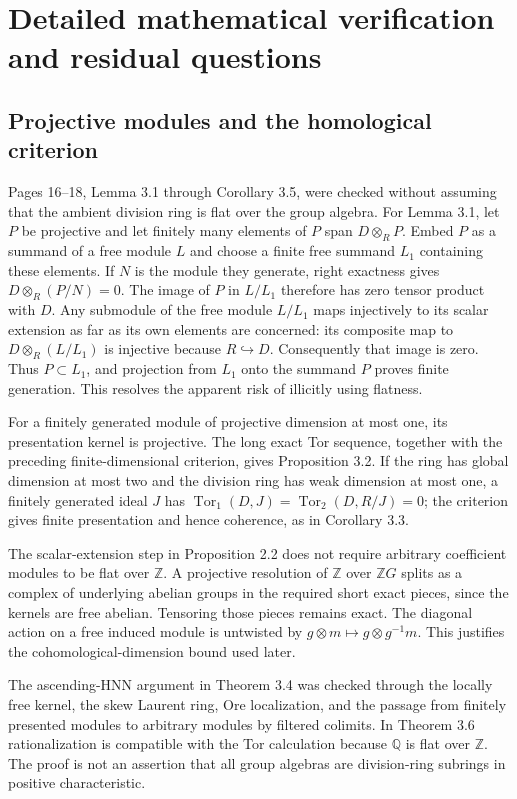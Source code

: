 \documentclass[10pt]{article}
\begin{document}
\section*{Detailed mathematical verification and residual questions}
\subsection*{Projective modules and the homological criterion}
Pages 16–18, Lemma 3.1 through Corollary 3.5, were checked without assuming that the ambient division ring is flat over the group algebra. For Lemma 3.1, let \(P\) be projective and let finitely many elements of \(P\) span \(D\otimes_RP\). Embed \(P\) as a summand of a free module \(L\) and choose a finite free summand \(L_1\) containing these elements. If \(N\) is the module they generate, right exactness gives \(D\otimes_R(P/N)=0\). The image of \(P\) in \(L/L_1\) therefore has zero tensor product with \(D\). Any submodule of the free module \(L/L_1\) maps injectively to its scalar extension as far as its own elements are concerned: its composite map to \(D\otimes_R(L/L_1)\) is injective because \(R\hookrightarrow D\). Consequently that image is zero. Thus \(P\subset L_1\), and projection from \(L_1\) onto the summand \(P\) proves finite generation. This resolves the apparent risk of illicitly using flatness.\par
For a finitely generated module of projective dimension at most one, its presentation kernel is projective. The long exact Tor sequence, together with the preceding finite-dimensional criterion, gives Proposition 3.2. If the ring has global dimension at most two and the division ring has weak dimension at most one, a finitely generated ideal \(J\) has \(\operatorname{Tor}_1(D,J)=\operatorname{Tor}_2(D,R/J)=0\); the criterion gives finite presentation and hence coherence, as in Corollary 3.3.\par
The scalar-extension step in Proposition 2.2 does not require arbitrary coefficient modules to be flat over \(\mathbb Z\). A projective resolution of \(\mathbb Z\) over \(\mathbb ZG\) splits as a complex of underlying abelian groups in the required short exact pieces, since the kernels are free abelian. Tensoring those pieces remains exact. The diagonal action on a free induced module is untwisted by \(g\otimes m\mapsto g\otimes g^{-1}m\). This justifies the cohomological-dimension bound used later.\par
The ascending-HNN argument in Theorem 3.4 was checked through the locally free kernel, the skew Laurent ring, Ore localization, and the passage from finitely presented modules to arbitrary modules by filtered colimits. In Theorem 3.6 rationalization is compatible with the Tor calculation because \(\mathbb Q\) is flat over \(\mathbb Z\). The proof is not an assertion that all group algebras are division-ring subrings in positive characteristic.\par
\end{document}
